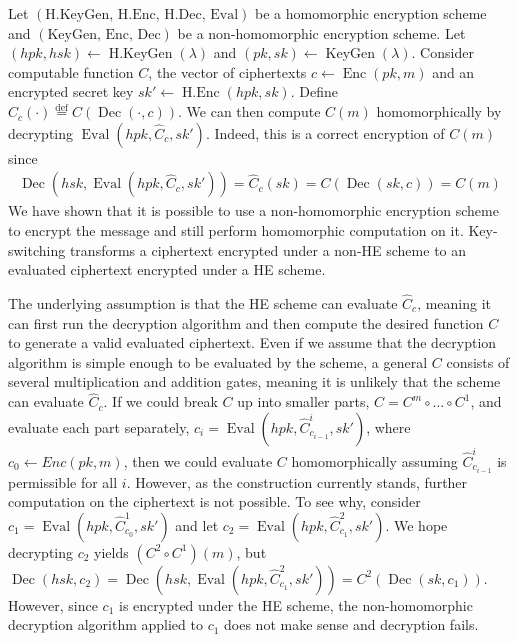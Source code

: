 Let $(\text{H.KeyGen, H.Enc, H.Dec, Eval})$ be a homomorphic encryption scheme and $(\text{KeyGen, Enc, Dec})$ be a non-homomorphic encryption scheme. Let $(hpk,hsk) \leftarrow \operatorname{H.KeyGen}(\lambda)$ and $(pk,sk) \leftarrow \operatorname{KeyGen}(\lambda)$. Consider computable function $C$, the vector of ciphertexts $c \leftarrow \operatorname{Enc}(pk,m)$ and an encrypted secret key $sk' \leftarrow \operatorname{H.Enc}(hpk,sk)$. Define $\hat{C}_c(\cdot) \stackrel{\mathrm{def}}{=} C(\operatorname{Dec}(\cdot, c))$. We can then compute $C(m)$ homomorphically by decrypting $\operatorname{Eval}(hpk,\hat{C}_c, sk')$. Indeed, this is a correct encryption of $C(m)$ since
\begin{equation*}
    \begin{aligned}
        \operatorname{Dec}(hsk,\operatorname{Eval}(hpk,\hat{C}_c, sk')) = \hat{C}_c(sk) = C(\operatorname{Dec}(sk, c)) = C(m)
    \end{aligned}
\end{equation*}
We have shown that it is possible to use a non-homomorphic encryption scheme to encrypt the message and still perform homomorphic computation on it. Key-switching transforms a ciphertext encrypted under a non-HE scheme to an evaluated ciphertext encrypted under a HE scheme.

The underlying assumption is that the HE scheme can evaluate $\hat{C}_c$, meaning it can first run the decryption algorithm and then compute the desired function $C$ to generate a valid evaluated ciphertext. Even if we assume that the decryption algorithm is simple enough to be evaluated by the scheme, a general $C$ consists of several multiplication and addition gates, meaning it is unlikely that the scheme can evaluate $\hat{C}_c$. If we could break $C$ up into smaller parts, $C = C^m \circ \dots \circ C^1$, and evaluate each part separately, $c_i = \operatorname{Eval}(hpk,\hat{C}^i_{c_{i-1}}, sk')$, where $c_0 \leftarrow Enc(pk,m)$, then we could evaluate $C$ homomorphically assuming $\hat{C}^i_{c_{i-1}}$ is permissible for all $i$. However, as the construction currently stands, further computation on the ciphertext is not possible. To see why, consider $c_1 = \operatorname{Eval}(hpk,\hat{C}^1_{c_0}, sk')$ and let $c_2 = \operatorname{Eval}(hpk,\hat{C}^2_{c_1}, sk')$. We hope decrypting $c_2$ yields $(C^2 \circ C^1)(m)$, but $\operatorname{Dec}(hsk,c_2) = \operatorname{Dec}(hsk,\operatorname{Eval}(hpk,\hat{C}^2_{c_1}, sk')) = C^2(\operatorname{Dec}(sk, c_1))$. However, since $c_1$ is encrypted under the HE scheme, the non-homomorphic decryption algorithm applied to $c_1$ does not make sense and decryption fails.

